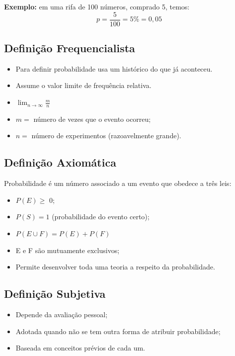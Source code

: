 \documentclass[
]{book}
\begin{document}
\textbf{Exemplo:} em uma rifa de 100 números, comprado 5, temos:
\[p=\dfrac{5}{100}=5 \% = 0,05 \]

\hypertarget{definiuxe7uxe3o-frequencialista}{%
\subsection{Definição Frequencialista}\label{definiuxe7uxe3o-frequencialista}}

\begin{itemize}
\item
  Para definir probabilidade usa um histórico do que já aconteceu.
\item
  Assume o valor limite de frequência relativa.
\item
  \(\lim_{n\rightarrow \infty} \frac{m}{n}\)
\item
  \(m =\) número de vezes que o evento ocorreu;
\item
  \(n =\) número de experimentos (razoavelmente grande).
\end{itemize}

\hypertarget{definiuxe7uxe3o-axiomuxe1tica}{%
\subsection{Definição Axiomática}\label{definiuxe7uxe3o-axiomuxe1tica}}

Probabilidade é um número associado a um evento que obedece a três leis:

\begin{itemize}
\item
  \(P(E) \geq\) 0;
\item
  \(P(S) = 1\) (probabilidade do evento certo);
\item
  \(P(E \cup F)=P(E) + P(F)\)
\item
  E e F são mutuamente exclusivos;
\item
  Permite desenvolver toda uma teoria a respeito da probabilidade.
\end{itemize}

\hypertarget{definiuxe7uxe3o-subjetiva}{%
\subsection{Definição Subjetiva}\label{definiuxe7uxe3o-subjetiva}}

\begin{itemize}
\item
  Depende da avaliação pessoal;
\item
  Adotada quando não se tem outra forma de atribuir probabilidade;
\item
  Baseada em conceitos prévios de cada um.
\end{itemize}
\end{document}

